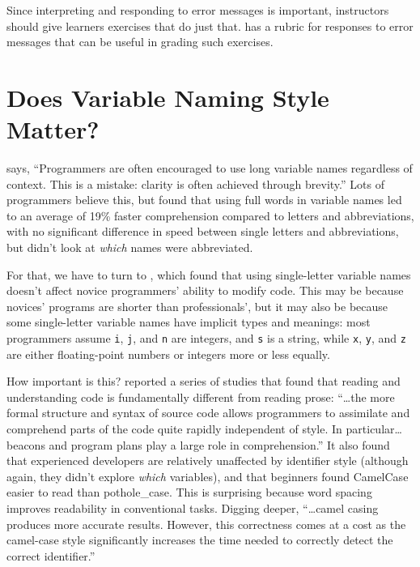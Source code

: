 Since interpreting and responding to error messages is important,
instructors should give learners exercises that do just that.
\cite{Marc2011} has a rubric for responses to error messages that can
be useful in grading such exercises.

\section{Does Variable Naming Style Matter?}\label{s:pck-code}

\cite{Kern1999} says, ``Programmers are often encouraged to use long
variable names regardless of context. This is a mistake: clarity is
often achieved through brevity.''  Lots of programmers believe this,
but \cite{Hofm2017} found that using full words in variable names led
to an average of 19\% faster comprehension compared to letters and
abbreviations, with no significant difference in speed between single
letters and abbreviations, but didn't look at \emph{which} names were
abbreviated.

For that, we have to turn to \cite{Beni2017}, which found that using
single-letter variable names doesn't affect novice programmers'
ability to modify code.  This may be because novices' programs are
shorter than professionals', but it may also be because some
single-letter variable names have implicit types and meanings: most
programmers assume \texttt{i}, \texttt{j}, and \texttt{n} are
integers, and \texttt{s} is a string, while \texttt{x}, \texttt{y},
and \texttt{z} are either floating-point numbers or integers more or
less equally.

How important is this?  \cite{Bink2012} reported a series of studies
that found that reading and understanding code is fundamentally
different from reading prose: ``{\ldots}the more formal structure and
syntax of source code allows programmers to assimilate and comprehend
parts of the code quite rapidly independent of style.  In
particular{\ldots}beacons and program plans play a large role in
comprehension.''  It also found that experienced developers are
relatively unaffected by identifier style (although again, they didn't
explore \emph{which} variables), and that beginners found CamelCase
easier to read than pothole\_case.  This is surprising because word
spacing improves readability in conventional tasks.  Digging deeper,
``{\ldots}camel casing produces more accurate results.  However, this
correctness comes at a cost as the camel-case style significantly
increases the time needed to correctly detect the correct
identifier.''

